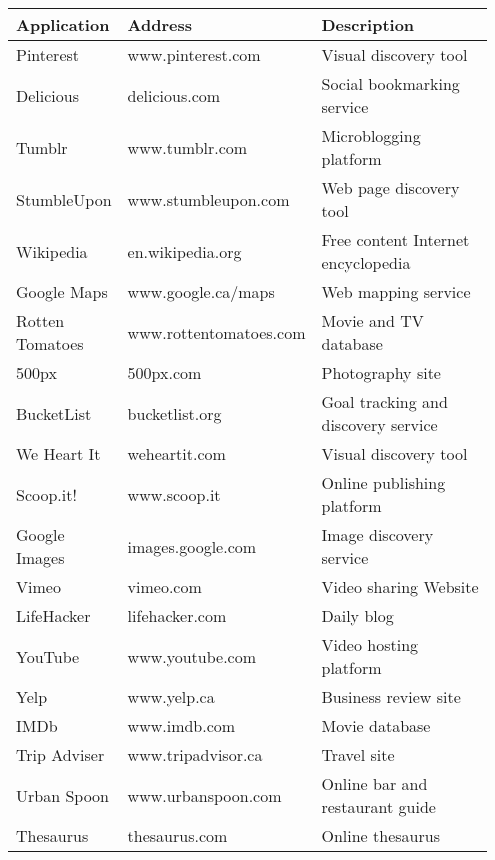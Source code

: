 {\begin{table*}[htbp]
\begin{tabular}{|p{0.20\linewidth}| p{0.30\linewidth}| p{0.45\linewidth}|}
\hline
Application     & Address 	& Description                                                                                                                                                                                                                                                                                            
\\
\hline
Pinterest       & www.pinterest.com 	& Visual discovery tool \\
\hline
Delicious       & delicious.com 		& Social bookmarking service \\
\hline
Tumblr          & www.tumblr.com 		& Microblogging platform \\
\hline
StumbleUpon     & www.stumbleupon.com  	& Web page discovery tool \\
\hline
Wikipedia       & en.wikipedia.org   	& Free content Internet encyclopedia\\
\hline
Google Maps     & www.google.ca/maps  	& Web mapping service\\
\hline
Rotten Tomatoes & www.rottentomatoes.com & Movie and TV database\\
\hline
500px           & 500px.com            	& Photography site\\
\hline
BucketList      & bucketlist.org  		& Goal tracking and discovery service\\
\hline
We Heart It     & weheartit.com 		& Visual discovery tool \\
\hline
Scoop.it!       & www.scoop.it 			& Online publishing platform \\
\hline
Google Images   & images.google.com  	& Image discovery service \\
\hline
Vimeo           & vimeo.com  			& Video sharing Website\\
\hline
LifeHacker      & lifehacker.com        & Daily blog \\
\hline
YouTube         & www.youtube.com 		& Video hosting platform \\
\hline
Yelp            & www.yelp.ca  			& Business review site\\
\hline
IMDb            & www.imdb.com  		& Movie database \\
\hline
Trip Adviser    & www.tripadvisor.ca 	& Travel site \\
\hline
Urban Spoon     & www.urbanspoon.com    & Online bar and restaurant guide\\
\hline
Thesaurus       & thesaurus.com         & Online thesaurus \\
\hline
\end{tabular}
\end{table*}

} %

